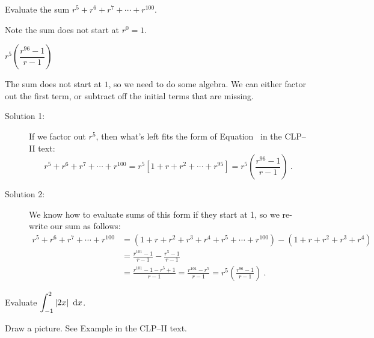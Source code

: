 \begin{Mquestion}\label{1.1geomb}
Evaluate the sum $r^5+r^6+r^7+\cdots+r^{100}$.
\end{Mquestion}
\begin{hint}
Note the sum does not start at $r^0=1$.
\end{hint}
\begin{answer}
$r^5\left(\dfrac{r^{96}-1}{r-1}\right)$
\end{answer}
\begin{solution}
The sum does not start at $1$, so we need to do some algebra. We can either factor out the first term, or subtract off the initial terms that are missing.
\begin{description}
\item[Solution 1:]
If we factor out $r^5$, then what's left fits the form of
Equation~ in the CLP--II text:
\[r^5+r^6+r^7+\cdots+r^{100}=r^5\left[1+r+r^2+\cdots + r^{95}\right]= r^5\left(\frac{r^{96}-1}{r-1}\right)\ .\]
\item[Solution 2:] We know how to evaluate sums of this form if they start at 1, so we re-write our sum as follows:
\begin{align*}
r^5+r^6+r^7+\cdots+r^{100}&=\left(1+r+r^2+r^3+r^4+r^5+\cdots+r^{100}\right) -
\left(1+r+r^2+r^3+r^4\right) \\
&=\frac{r^{101}-1}{r-1} - \frac{r^5-1}{r-1}\\
&=\frac{r^{101}-1-r^5+1}{r-1}=\frac{r^{101}-r^5}{r-1}=r^5\left(\frac{r^{96}-1}{r-1}\right)\ .
\end{align*}
\end{description}
\end{solution}




\begin{question}[M105 2013A]\label{prob:s1.1_2}\label{1.1defintgeoma}
Evaluate ${\displaystyle\int_{-1}^2 |2x|\ \,\dee{x}}$.
\end{question}

\begin{hint}
Draw a picture. See Example  in the
CLP--II text.
\end{hint}

